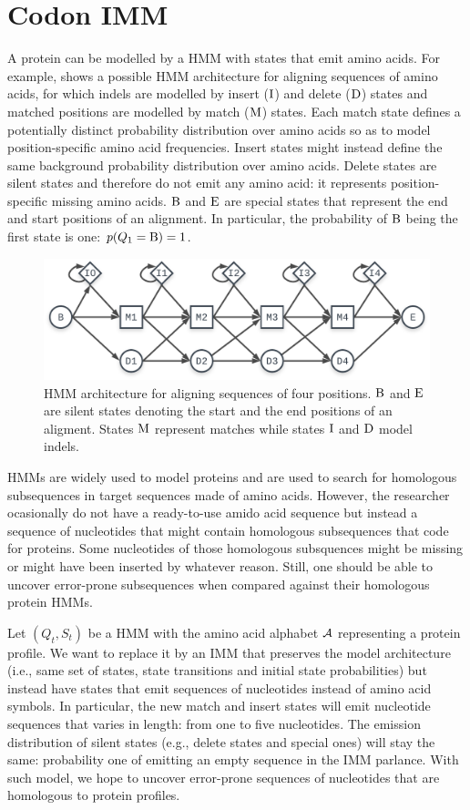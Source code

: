 \section{Codon IMM}

A protein can be modelled by a HMM with states that emit amino acids. For example,
 shows a possible HMM architecture for aligning sequences of amino acids, for
which indels are modelled by insert ($\mathrm{I}$) and delete ($\mathrm{D}$) states and matched
positions are modelled by match ($\mathrm{M}$) states. Each match state defines a potentially
distinct probability distribution over amino acids so as to model position-specific amino acid
frequencies. Insert states might instead define the same background probability distribution over
amino acids. Delete states are silent states and therefore do not emit any amino acid: it represents
position-specific missing amino acids. $\mathrm{B}$ and $\mathrm{E}$ are special states that represent
the end and start positions of an alignment. In particular, the probability of $\mathrm{B}$ being the
first state is one: $p(Q_1=\mathrm{B})=1$.

\begin{figure}[htbp]
  \centering
  \captionsetup{width=.5\linewidth}
  \includegraphics[width=.5\linewidth]{figure/core-model}
  \caption{HMM architecture for aligning sequences of four positions. $\mathrm{B}$ and $\mathrm{E}$
  are silent states denoting the start and the end positions of an aligment. States $\mathrm{M}$
  represent matches while states $\mathrm{I}$ and $\mathrm{D}$ model indels.}\label{fig:core-model}
\end{figure}

HMMs are widely used to model proteins and are used to search for homologous subsequences in target
sequences made of amino acids. However, the researcher ocasionally do not have a ready-to-use amido
acid sequence but instead a sequence of nucleotides that might contain homologous subsequences that
code for proteins. Some nucleotides of those homologous subsquences might be missing or might have
been inserted by whatever reason. Still, one should be able to uncover error-prone subsequences when
compared against their homologous protein HMMs.

Let $(Q_t, S_t)$ be a HMM with the amino acid alphabet $\mathcal{A}$ representing a protein profile. We
want to replace it by an IMM that preserves the model architecture (i.e., same set of states, state
transitions and initial state probabilities) but instead have states that emit sequences of
nucleotides instead of amino acid symbols. In particular, the new match and insert states will emit
nucleotide sequences that varies in length: from one to five nucleotides. The emission distribution
of silent states (e.g., delete states and special ones) will stay the same: probability one of
emitting an empty sequence in the IMM parlance. With such model, we hope to uncover error-prone
sequences of nucleotides that are homologous to protein profiles.

